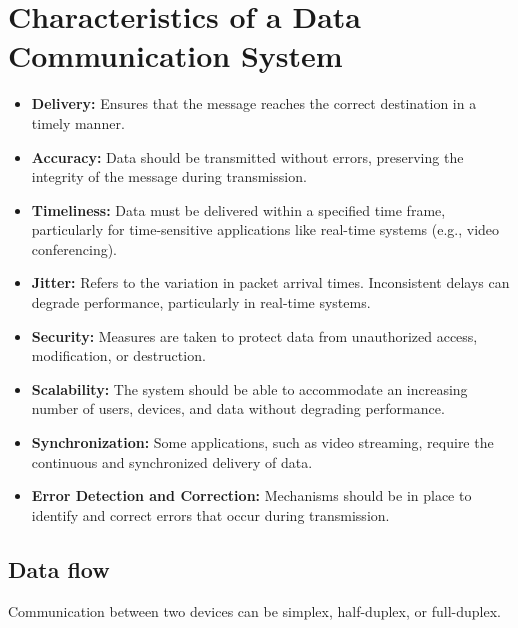\section{Characteristics of a Data Communication System}
\begin{itemize}
    \item \textbf{Delivery:} Ensures that the message reaches the correct destination in a timely manner.
    \item \textbf{Accuracy:} Data should be transmitted without errors, preserving the integrity of the message during transmission.
    \item \textbf{Timeliness:} Data must be delivered within a specified time frame, particularly for time-sensitive applications like real-time systems (e.g., video conferencing).
    \item \textbf{Jitter:} Refers to the variation in packet arrival times. Inconsistent delays can degrade performance, particularly in real-time systems.
    \item \textbf{Security:} Measures are taken to protect data from unauthorized access, modification, or destruction.
    \item \textbf{Scalability:} The system should be able to accommodate an increasing number of users, devices, and data without degrading performance.
    \item \textbf{Synchronization:} Some applications, such as video streaming, require the continuous and synchronized delivery of data.
    \item \textbf{Error Detection and Correction:} Mechanisms should be in place to identify and correct errors that occur during transmission.
\end{itemize}

\pagebreak
\subsection{Data flow}
Communication between two devices can be simplex, half-duplex, or full-duplex.

